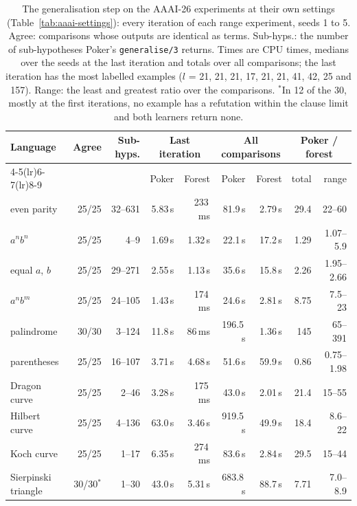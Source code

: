 \documentclass[11pt]{article}
\begin{document}
\begin{table}[ht]
\centering
\small
\begin{tabular}{lrrrrrrrr}
\toprule
Language & Agree & Sub-hyps. & \multicolumn{2}{c}{Last iteration} & \multicolumn{2}{c}{All comparisons} & \multicolumn{2}{c}{Poker / forest}\\
\cmidrule(lr){4-5}\cmidrule(lr){6-7}\cmidrule(lr){8-9}
 & & & Poker & Forest & Poker & Forest & total & range\\
\midrule
even parity      & 25/25 & 32--631  & 5.83\,s  & 233\,ms  & 81.9\,s  & 2.79\,s & 29.4 & 22--60\\
$a^nb^n$         & 25/25 & 4--9     & 1.69\,s  & 1.32\,s  & 22.1\,s  & 17.2\,s & 1.29 & 1.07--5.9\\
equal $a$, $b$   & 25/25 & 29--271  & 2.55\,s  & 1.13\,s  & 35.6\,s  & 15.8\,s & 2.26 & 1.95--2.66\\
$a^nb^m$         & 25/25 & 24--105  & 1.43\,s  & 174\,ms  & 24.6\,s  & 2.81\,s & 8.75 & 7.5--23\\
palindrome       & 30/30 & 3--124   & 11.8\,s  & 86\,ms   & 196.5\,s & 1.36\,s & 145  & 65--391\\
parentheses      & 25/25 & 16--107  & 3.71\,s  & 4.68\,s  & 51.6\,s  & 59.9\,s & 0.86 & 0.75--1.98\\
\midrule
Dragon curve     & 25/25 & 2--46    & 3.28\,s  & 175\,ms  & 43.0\,s  & 2.01\,s & 21.4 & 15--55\\
Hilbert curve    & 25/25 & 4--136   & 63.0\,s  & 3.46\,s  & 919.5\,s & 49.9\,s & 18.4 & 8.6--22\\
Koch curve       & 25/25 & 1--17    & 6.35\,s  & 274\,ms  & 83.6\,s  & 2.84\,s & 29.5 & 15--44\\
Sierpinski triangle & 30/30$^*$ & 1--30 & 43.0\,s & 5.31\,s & 683.8\,s & 88.7\,s & 7.71 & 7.0--8.9\\
\bottomrule
\end{tabular}
\caption{The generalisation step on the AAAI-26 experiments at their own settings
(Table~\ref{tab:aaai-settings}): every iteration of each range experiment, seeds 1 to
5. Agree: comparisons whose outputs are identical as terms. Sub-hyps.: the number
of sub-hypotheses Poker's \nolinkurl{generalise/3} returns. Times are CPU times,
medians over the seeds at the last iteration and totals over all comparisons; the
last iteration has the most labelled examples ($l$ = 21, 21, 21, 17, 21, 21, 41, 42,
25 and 157). Range: the least and greatest ratio over the comparisons.
$^*$In 12 of the 30, mostly at the first iterations, no example has a refutation
within the clause limit and both learners return none.}
\label{tab:aaai-gen}
\end{table}
\end{document}
